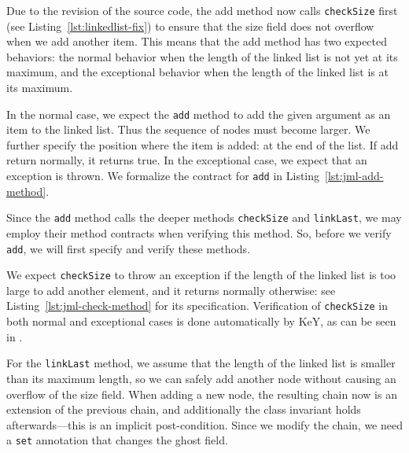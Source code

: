 \documentclass[runningheads]{llncs}
\theoremstyle{remark}
\begin{document}
Due to the revision of the source code, the add method now calls \texttt{checkSize} first (see Listing~\ref{lst:linkedlist-fix}) to ensure that the size field does not overflow when we add another item. This means that the add method has two expected behaviors: the normal behavior when the length of the linked list is not yet at its maximum, and the exceptional behavior when the length of the linked list is at its maximum.

In the normal case, we expect the \texttt{add} method to add the given argument as an item to the linked list. Thus the sequence of nodes must become larger. We further specify the position where the item is added: at the end of the list. If add return normally, it returns true. In the exceptional case, we expect that an exception is thrown. We formalize the contract for \texttt{add} in Listing~\ref{lst:jml-add-method}.



Since the \texttt{add} method calls the deeper methods \texttt{checkSize} and \texttt{linkLast}, we may employ their method contracts when verifying this method. So, before we verify \texttt{add}, we will first specify and verify these methods.

We expect \texttt{checkSize} to throw an exception if the length of the linked list is too large to add another element, and it returns normally otherwise: see Listing~\ref{lst:jml-check-method} for its specification. Verification of \texttt{checkSize} in both normal and exceptional cases is done automatically by KeY, as can be seen in .



For the \texttt{linkLast} method, we assume that the length of the linked list is smaller than its maximum length, so we can safely add another node without causing an overflow of the size field. When adding a new node, the resulting chain now is an extension of the previous chain, and additionally the class invariant holds afterwards---this is an implicit post-condition. Since we modify the chain, we need a \texttt{set} annotation that changes the ghost field.


\end{document}
